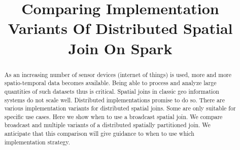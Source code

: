 \documentclass[conference]{IEEEtran}
\begin{document}
\title{Comparing Implementation Variants Of Distributed Spatial Join On Spark\\
}

\author{
\and
{}
}

\maketitle

\begin{abstract}
As an increasing number of sensor devices (internet of things) is used, more and more spatio-temporal data becomes available.
Being able to process and analyze large quantities of such datasets thus is critical.
Spatial joins in classic geo information systems do not scale well. Distributed implementations promise to do so.
There are various implementation variants for distributed spatial joins.
Some are only suitable for specific use cases.
Here we show when to use a broadcast spatial join.
We compare broadcast and multiple variants of a distributed spatially partitioned join.
We anticipate that this comparison will give guidance to when to use which implementation strategy.
\end{abstract}
\end{document}
